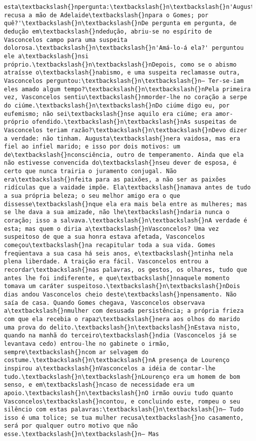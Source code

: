 \begin{Verbatim}[commandchars=\\\{\}]
esta\textbackslash{}npergunta:\textbackslash{}n\textbackslash{}n'Augusta recusa a mão de Adelaide\textbackslash{}npara o Gomes; por quê?'\textbackslash{}n\textbackslash{}nDe pergunta em pergunta, de dedução em\textbackslash{}ndedução, abriu-se no espírito de Vasconcelos campo para uma suspeita dolorosa.\textbackslash{}n\textbackslash{}n'Amá-lo-á ela?' perguntou ele a\textbackslash{}nsi próprio.\textbackslash{}n\textbackslash{}nDepois, como se o abismo atraísse o\textbackslash{}nabismo, e uma suspeita reclamasse outra, Vasconcelos perguntou:\textbackslash{}n\textbackslash{}n— Ter-se-iam eles amado algum tempo?\textbackslash{}n\textbackslash{}nPela primeira vez, Vasconcelos sentiu\textbackslash{}nmorder-lhe no coração a serpe do ciúme.\textbackslash{}n\textbackslash{}nDo ciúme digo eu, por eufemismo; não sei\textbackslash{}nse aquilo era ciúme; era amor-próprio ofendido.\textbackslash{}n\textbackslash{}nAs suspeitas de Vasconcelos teriam razão?\textbackslash{}n\textbackslash{}nDevo dizer a verdade: não tinham. Augusta\textbackslash{}nera vaidosa, mas era fiel ao infiel marido; e isso por dois motivos: um de\textbackslash{}nconsciência, outro de temperamento. Ainda que ela não estivesse convencida do\textbackslash{}nseu dever de esposa, é certo que nunca trairia o juramento conjugal. Não era\textbackslash{}nfeita para as paixões, a não ser as paixões ridículas que a vaidade impõe. Ela\textbackslash{}namava antes de tudo a sua própria beleza; o seu melhor amigo era o que dissesse\textbackslash{}nque ela era mais bela entre as mulheres; mas se lhe dava a sua amizade, não lhe\textbackslash{}ndaria nunca o coração; isso a salvava.\textbackslash{}n\textbackslash{}nA verdade é esta; mas quem o diria a\textbackslash{}nVasconcelos? Uma vez suspeitoso de que a sua honra estava afetada, Vasconcelos começou\textbackslash{}na recapitular toda a sua vida. Gomes freqüentava a sua casa há seis anos, e\textbackslash{}ntinha nela plena liberdade. A traição era fácil. Vasconcelos entrou a recordar\textbackslash{}nas palavras, os gestos, os olhares, tudo que antes lhe foi indiferente, e que\textbackslash{}nnaquele momento tomava um caráter suspeitoso.\textbackslash{}n\textbackslash{}nDois dias andou Vasconcelos cheio deste\textbackslash{}npensamento. Não saía de casa. Quando Gomes chegava, Vasconcelos observava a\textbackslash{}nmulher com desusada persistência; a própria frieza com que ela recebia o rapaz\textbackslash{}nera aos olhos do marido uma prova do delito.\textbackslash{}n\textbackslash{}nEstava nisto, quando na manhã do terceiro\textbackslash{}ndia (Vasconcelos já se levantava cedo) entrou-lhe no gabinete o irmão, sempre\textbackslash{}ncom ar selvagem do costume.\textbackslash{}n\textbackslash{}nA presença de Lourenço inspirou a\textbackslash{}nVasconcelos a idéia de contar-lhe tudo.\textbackslash{}n\textbackslash{}nLourenço era um homem de bom senso, e em\textbackslash{}ncaso de necessidade era um apoio.\textbackslash{}n\textbackslash{}nO irmão ouviu tudo quanto Vasconcelos\textbackslash{}ncontou, e concluindo este, rompeu o seu silêncio com estas palavras:\textbackslash{}n\textbackslash{}n— Tudo isso é uma tolice; se tua mulher recusa\textbackslash{}no casamento, será por qualquer outro motivo que não esse.\textbackslash{}n\textbackslash{}n— Mas 
\end{Verbatim}
